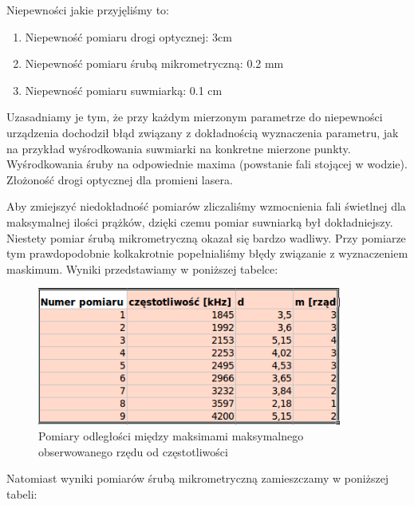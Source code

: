 \documentclass[a4paper,12pt]{article}
\begin{document}
Niepewności jakie przyjęliśmy to:
\begin{enumerate}
  \item Niepewność pomiaru drogi optycznej: 3cm 
  \item Niepewność pomiaru śrubą mikrometryczną: 0.2 mm 
  \item Niepewność pomiaru suwmiarką: 0.1 cm 
  
\end{enumerate}

Uzasadniamy je tym, że przy każdym mierzonym parametrze do niepewności urządzenia dochodził błąd związany z dokładnością wyznaczenia parametru, jak na przykład wyśrodkowania suwmiarki na konkretne mierzone punkty. Wyśrodkowania śruby na odpowiednie maxima (powstanie fali stojącej w wodzie). Złożoność drogi optycznej dla promieni lasera. 

Aby zmiejszyć niedokładność pomiarów zliczaliśmy wzmocnienia fali świetlnej dla maksymalnej ilości prążków, dzięki czemu pomiar suwniarką był dokładniejszy. Niestety pomiar śrubą mikrometryczną okazał się bardzo wadliwy. Przy pomiarze tym prawdopodobnie kolkakrotnie popełnialiśmy błędy związanie z wyznaczeniem maskimum. Wyniki przedstawiamy w poniższej tabelce: 


\begin{figure} [H]
  \begin{center}
    \includegraphics[width = 10cm]{tab1.png}
    \caption{Pomiary odległości między maksimami maksymalnego obserwowanego rzędu od częstotliwości}
  \end{center}
\end{figure}

Natomiast wyniki pomiarów śrubą mikrometryczną zamieszczamy w poniższej tabeli: 
\end{document}
